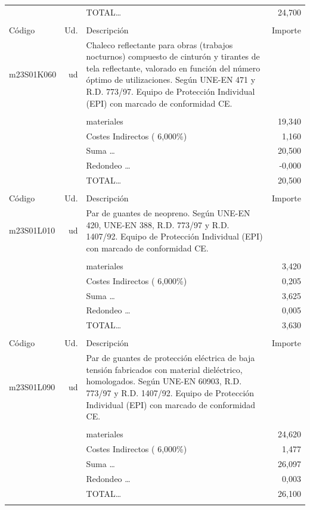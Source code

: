 \documentclass{book}%
\begin{document}
\begin{supertabular}{l r p{60mm} r}
%
&&TOTAL\ldots&    24,700\\%
&&&\\%
Código&Ud.&Descripción&Importe\\%
\hline%
m23S01K060&ud&Chaleco reflectante para obras (trabajos nocturnos) compuesto de cinturón y tirantes de tela reflectante, valorado en función del número óptimo de utilizaciones. Según UNE{-}EN 471 y R.D. 773/97. Equipo de Protección Individual (EPI) con marcado de conformidad CE.&\\%
&&&\\%
&&materiales&    19,340\\%
&&Costes Indirectos (     6,000\%)&     1,160\\%
&&Suma \ldots&    20,500\\%
&&Redondeo \ldots&    {-}0,000\\%
%
&&TOTAL\ldots&    20,500\\%
&&&\\%
Código&Ud.&Descripción&Importe\\%
\hline%
m23S01L010&ud&Par de guantes de neopreno. Según UNE{-}EN 420, UNE{-}EN 388, R.D. 773/97 y R.D. 1407/92. Equipo de Protección Individual (EPI) con marcado de conformidad CE.&\\%
&&&\\%
&&materiales&     3,420\\%
&&Costes Indirectos (     6,000\%)&     0,205\\%
&&Suma \ldots&     3,625\\%
&&Redondeo \ldots&     0,005\\%
%
&&TOTAL\ldots&     3,630\\%
&&&\\%
Código&Ud.&Descripción&Importe\\%
\hline%
m23S01L090&ud&Par de guantes de protección eléctrica de baja tensión fabricados con material dieléctrico, homologados. Según UNE{-}EN 60903, R.D. 773/97 y R.D. 1407/92. Equipo de Protección Individual (EPI) con marcado de conformidad CE.&\\%
&&&\\%
&&materiales&    24,620\\%
&&Costes Indirectos (     6,000\%)&     1,477\\%
&&Suma \ldots&    26,097\\%
&&Redondeo \ldots&     0,003\\%
%
&&TOTAL\ldots&    26,100\\%
&&&\\%

\end{supertabular}
\end{document}
